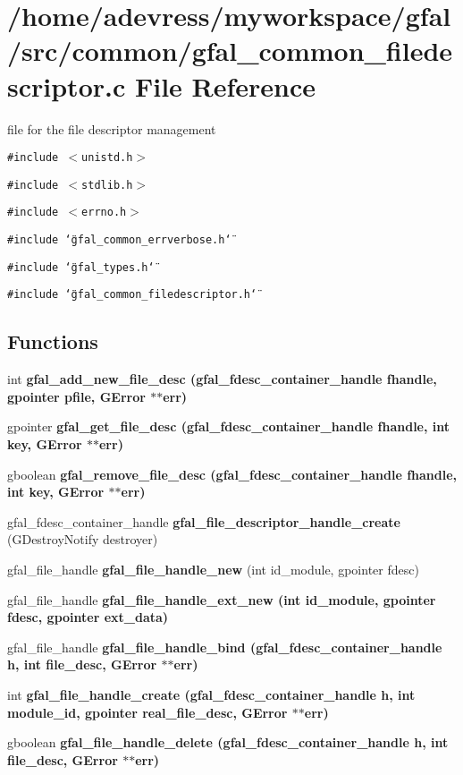 \section{/home/adevress/myworkspace/gfal/src/common/gfal\_\-common\_\-filedescriptor.c File Reference}
\label{gfal__common__filedescriptor_8c}
file for the file descriptor management 

{\tt \#include $<$unistd.h$>$}\par
{\tt \#include $<$stdlib.h$>$}\par
{\tt \#include $<$errno.h$>$}\par
{\tt \#include \char`\"{}gfal\_\-common\_\-errverbose.h\char`\"{}}\par
{\tt \#include \char`\"{}gfal\_\-types.h\char`\"{}}\par
{\tt \#include \char`\"{}gfal\_\-common\_\-filedescriptor.h\char`\"{}}\par
\subsection*{Functions}
\begin{CompactItemize}
\item 
int \bf{gfal\_\-add\_\-new\_\-file\_\-desc} (gfal\_\-fdesc\_\-container\_\-handle fhandle, gpointer pfile, GError $\ast$$\ast$err)
\item 
gpointer \bf{gfal\_\-get\_\-file\_\-desc} (gfal\_\-fdesc\_\-container\_\-handle fhandle, int key, GError $\ast$$\ast$err)
\item 
gboolean \bf{gfal\_\-remove\_\-file\_\-desc} (gfal\_\-fdesc\_\-container\_\-handle fhandle, int key, GError $\ast$$\ast$err)
\item 
gfal\_\-fdesc\_\-container\_\-handle \textbf{gfal\_\-file\_\-descriptor\_\-handle\_\-create} (GDestroy\-Notify destroyer)\label{gfal__common__filedescriptor_8c_13934d51ad328aabb0721ef7793ad233}

\item 
gfal\_\-file\_\-handle \textbf{gfal\_\-file\_\-handle\_\-new} (int id\_\-module, gpointer fdesc)\label{gfal__common__filedescriptor_8c_9d05f277c63dea4b06fb518237a5da11}

\item 
gfal\_\-file\_\-handle \bf{gfal\_\-file\_\-handle\_\-ext\_\-new} (int id\_\-module, gpointer fdesc, gpointer ext\_\-data)
\item 
gfal\_\-file\_\-handle \bf{gfal\_\-file\_\-handle\_\-bind} (gfal\_\-fdesc\_\-container\_\-handle h, int file\_\-desc, GError $\ast$$\ast$err)
\item 
int \bf{gfal\_\-file\_\-handle\_\-create} (gfal\_\-fdesc\_\-container\_\-handle h, int module\_\-id, gpointer real\_\-file\_\-desc, GError $\ast$$\ast$err)
\item 
gboolean \bf{gfal\_\-file\_\-handle\_\-delete} (gfal\_\-fdesc\_\-container\_\-handle h, int file\_\-desc, GError $\ast$$\ast$err)
\end{CompactItemize}


